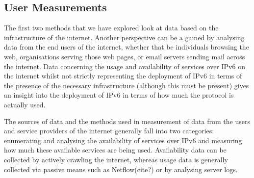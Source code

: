 \subsection{User Measurements}

The first two methods that we have explored look at data based on the
infrastructure of the internet. Another perspective can be a gained by analysing
data from the end users of the internet, whether that be individuals browsing
the web, organisations serving those web pages, or email servers sending mail
across the internet. Data concerning the usage and availability of services over
IPv6 on the internet whilst not strictly representing the deployment of IPv6 in
terms of the presence of the necessary infrastructure (although this must be
present) gives an insight into the deployment of IPv6 in terms of
how much the protocol is actually used.

The sources of data and the methods used in measurement of data from the users
and service providers of the internet generally fall into two categories:
enumerating and analysing the availability of services over IPv6 and measuring
how much these available services are being used. Availability data can be
collected by actively crawling the internet, whereas usage data is generally
collected via passive means such as Netflow(cite?) or by analysing server logs.

